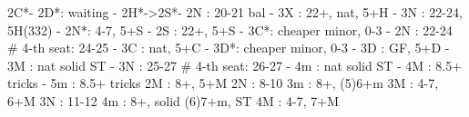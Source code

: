 2C*- 
2D*: waiting
   - 2H*->2S*- 2N : 20-21 bal
             - 3X : 22+, nat, 5+H
             - 3N : 22-24, 5H(332)
        - 2N*: 4-7, 5+S
   - 2S : 22+, 5+S
        - 3C*: cheaper minor, 0-3
   - 2N : 22-24  # 4-th seat: 24-25
   - 3C : nat, 5+C
        - 3D*: cheaper minor, 0-3
   - 3D : GF, 5+D
   - 3M : nat solid ST
   - 3N : 25-27  # 4-th seat: 26-27
   - 4m : nat solid ST
   - 4M : 8.5+ tricks
   - 5m : 8.5+ tricks
2M : 8+, 5+M
2N : 8-10
3m : 8+, (5)6+m 
3M : 4-7, 6+M
3N : 11-12
4m : 8+, solid (6)7+m, ST
4M : 4-7, 7+M
